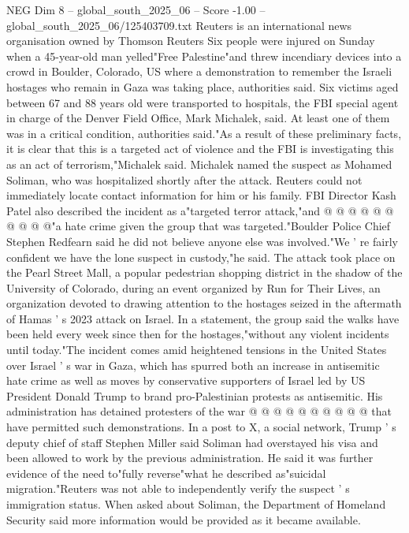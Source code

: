 \begin{textsample}{NEG Dim 8 – global\_south\_2025\_06 – Score -1.00 – global\_south\_2025\_06/125403709.txt}  \label{ex:f8_neg_255}
Reuters is an international news organisation owned by Thomson Reuters Six people were injured on Sunday when a 45-year-old man yelled"Free Palestine"and threw incendiary devices into a crowd in Boulder, Colorado, US where a demonstration to remember the Israeli hostages who remain in Gaza was taking place, authorities said.
Six victims aged between 67 and 88 years old were transported to hospitals, the FBI special agent in charge of the Denver Field Office, Mark Michalek, said.
At least one of them was in a critical condition, authorities said."As a result of these preliminary facts, it is clear that this is a targeted act of violence and the FBI is investigating this as an act of terrorism,"Michalek said.
Michalek named the suspect as Mohamed Soliman, who was hospitalized shortly after the attack.
Reuters could not immediately locate contact information for him or his family.
FBI Director Kash Patel also described the incident as a"targeted terror attack,"and @ @ @ @ @ @ @ @ @ @"a hate crime given the group that was targeted."Boulder Police Chief Stephen Redfearn said he did not believe anyone else was involved."We ' re fairly confident we have the lone suspect in custody,"he said.
The attack took place on the Pearl Street Mall, a popular pedestrian shopping district in the shadow of the University of Colorado, during an event organized by Run for Their Lives, an organization devoted to drawing attention to the hostages seized in the aftermath of Hamas ' s 2023 attack on Israel.
In a statement, the group said the walks have been held every week since then for the hostages,"without any violent incidents until today."The incident comes amid heightened tensions in the United States over Israel ' s war in Gaza, which has spurred both an increase in antisemitic hate crime as well as moves by conservative supporters of Israel led by US President Donald Trump to brand pro-Palestinian protests as antisemitic.
His administration has detained protesters of the war @ @ @ @ @ @ @ @ @ @ that have permitted such demonstrations.
In a post to X, a social network, Trump ' s deputy chief of staff Stephen Miller said Soliman had overstayed his visa and been allowed to work by the previous administration.
He said it was further evidence of the need to"fully reverse"what he described as"suicidal migration."Reuters was not able to independently verify the suspect ' s immigration status.
When asked about Soliman, the Department of Homeland Security said more information would be provided as it became available.

\end{textsample}
